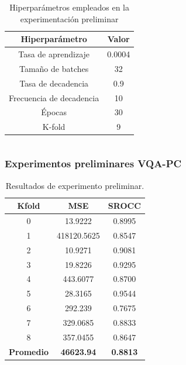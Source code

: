 \begin{frame}
\begin{columns}
  \begin{table}[htp]
    \small
    \begin{center}
      \begin{tabular}[c]{|c|c|}
        \hline
        \rowcolor[HTML]{FFC702}
        \textbf{Hiperparámetro} & \textbf{Valor} \\ 
        \hline 
        Tasa de aprendizaje &  0.0004 \\ 
        \hline 
        Tamaño de batches & 32 \\ 
        \hline 
        Tasa de decadencia & 0.9 \\ 
        \hline 
        Frecuencia de decadencia & 10 \\ 
        \hline 
        Épocas & 30 \\ 
        \hline 
        K-fold & 9 \\ 
        \hline 
      \end{tabular}
    \end{center}
    \caption[Hiperparámetros empleados en la experimentación preliminar.]{
      Hiperparámetros empleados en la experimentación preliminar\footnotemark[12]
    }
      \vspace{-.6cm}
    \label{tab:HiperSJTU}
  \end{table}
    \end{columns}
\end{frame}

\begin{frame}
  \frametitle{Experimentos preliminares VQA-PC}
\begin{table}[htp]
  \small
  \begin{center}
    \begin{tabular}[c]{|c|c|c|}
      \hline
      \rowcolor[HTML]{FFC702}
      \textbf{Kfold} & \textbf{MSE} & \textbf{SROCC} \\ 
      \hline 
      0 & 13.9222 & 0.8995 \\
      \hline 
      1 & 418120.5625 & 0.8547 \\ 
      \hline 
      2 & 10.9271 & 0.9081 \\
      \hline 
      3 & 19.8226 & 0.9295 \\ 
      \hline 
      4 & 443.6077 & 0.8700 \\ 
      \hline 
      5 & 28.3165 & 0.9544 \\ 
      \hline 
      6 & 292.239 & 0.7675 \\ 
      \hline 
      7 & 329.0685 & 0.8833 \\ 
      \hline 
      8 & 357.0455 & 0.8647 \\ 
      \hline
      \textbf{\cellcolor[HTML]{FFC702}Promedio} & \textbf{46623.94} & \textbf{0.8813} \\ 
      \hline
    \end{tabular}
  \end{center}
  \caption[Resultados de experimento preliminar.]{
    Resultados de experimento preliminar. 
  }
  \label{tab:PreTestResults}
\end{table}
\end{frame}

